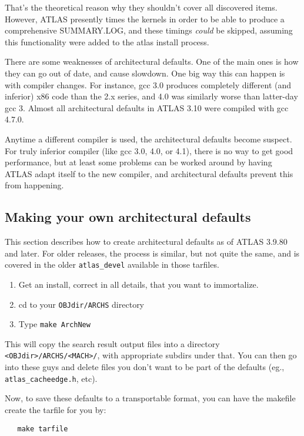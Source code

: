 \documentclass[11pt]{article}
\begin{document}
That's the theoretical reason why they shouldn't cover all discovered items.
However, ATLAS presently times the kernels in order to be able to
produce a comprehensive SUMMARY.LOG, and these timings {\em could} be skipped,
assuming this functionality were added to the atlas install process.

There are some weaknesses of architectural defaults.  One of the main ones
is how they can go out of date, and cause slowdown.  One big way this can
happen is with compiler changes.  For instance, gcc 3.0 produces completely
different (and inferior) x86 code than the 2.x series, and 4.0 was similarly
worse than latter-day gcc 3.  Almost all architectural defaults in ATLAS 3.10
were compiled with gcc 4.7.0.  

Anytime a different compiler is used, the architectural defaults become
suspect.  For truly inferior compiler (like gcc 3.0, 4.0, or 4.1), there is no
way to get good performance, but at least some problems can be worked
around by having ATLAS adapt itself to the new compiler, and architectural
defaults prevent this from happening.

\subsection{Making your own architectural defaults}
This section describes how to create architectural defaults as of ATLAS
3.9.80 and later.  For older releases, the process is similar, but not quite
the same, and is covered in the older {\tt atlas\_devel} available in
those tarfiles.
\begin{enumerate}
\item Get an install, correct in all details, that you want to immortalize.
\item cd to your {\tt OBJdir/ARCHS} directory
\item Type {\tt make ArchNew}
\end{enumerate}

This will copy the search result output files into a directory
{\tt <OBJdir>/ARCHS/<MACH>/}, with appropriate subdirs under
that.  You can then go into these guys and delete files you don't want to
be part of the defaults (eg., {\tt atlas\_cacheedge.h}, etc).

Now, to save these defaults to a transportable format, you can have the
makefile create the tarfile for you by:
\begin{verbatim}
   make tarfile
\end{verbatim}
\end{document}
